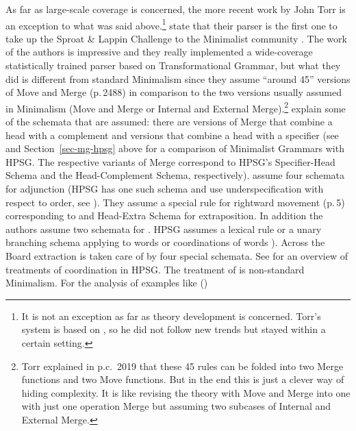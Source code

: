 As\label{page-torr-implementation-beginning} far as large-scale coverage is concerned, the more recent work by John Torr is an
exception to what was said above.\footnote{%
  It is not an exception as far as theory development is concerned. Torr's system is based on
  , so he did not follow new trends but stayed within a certain setting.
} \citet*{TSSC2019a} state that their parser is the first one to take up the Sproat 
\& Lappin Challenge to the Minimalist community \citeyearpar{SL2005a}. The work of the authors is
impressive and they really implemented a wide-coverage statistically trained parser based on
Transformational Grammar, but what they did is different from standard Minimalism since they assume
``around 45'' versions of Move and Merge (p.\,2488) in comparison to the two versions usually
assumed in Minimalism (Move and Merge or Internal and External Merge).\footnote{%
 Torr explained in p.c.\ 2019 that these 45 rules can be folded into two Merge functions and two Move
 functions. But in the end this is just a clever way of hiding complexity. It is like \citet[]{Chomsky2005a}
 revising the theory with Move and Merge into one with just one operation Merge but assuming two
 subcases of Internal and External Merge.
} \citet{TS2016a} explain some of the schemata that are assumed: there are versions of Merge that
combine a head with a complement and versions that combine a head with a specifier (see
\citet{MuellerUnifying} and Section~\ref{sec-mg-hpsg} above for a comparison of Minimalist Grammars
with HPSG. The respective variants of Merge correspond to HPSG's Specifier-Head Schema and the Head-Complement Schema,
respectively). \citet[]{TS2016a} assume four schemata for adjunction (HPSG has one such schema and use
underspecification with respect to order, see ). They assume a special rule
for rightward movement (p.\,5) corresponding to  and  Head-Extra
Schema for extraposition. In addition the authors assume two schemata for . HPSG
assumes a lexical rule or a unary branching schema applying to words or coordinations of words
\parencites{MuellerGS}[Section~5.1]{MuellerOrder}). Across the Board extraction \citep[Section~4.2.4.1]{Ross67a} is taken care of by
four special schemata. See \citet{AC2021a} for an overview of treatments of coordination in
HPSG. The treatment of  is non-standard Minimalism. For the analysis of examples like ()

